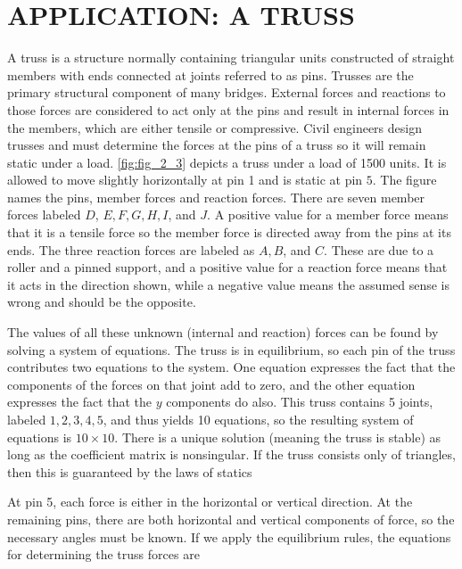 \documentclass[../main.tex]{subfiles}
\begin{document}
\section[Application: A Truss]{APPLICATION: A TRUSS}
A truss is a structure normally containing triangular units constructed of straight members with ends connected at joints referred to as pins. Trusses are the primary structural component of many bridges. External forces and reactions to those forces are considered to act only at the pins and result in internal forces in the members, which are either tensile or compressive. Civil engineers design trusses and must determine the forces at the pins of a truss so it will remain static under a load. \autoref{fig:fig_2_3} depicts a truss under a load of 1500 units. It is allowed to move slightly horizontally at pin 1 and is static at pin $5 .$ The figure names the pins, member forces and reaction forces. There are seven member forces labeled $D$, $E, F, G, H, I$, and $J .$ A positive value for a member force means that it is a tensile force so the member force is directed away from the pins at its ends. The three reaction forces are labeled as $A, B$, and $C .$ These are due to a roller and a pinned support, and a positive value for a reaction force means that it acts in the direction shown, while a negative value means the assumed sense is wrong and should be the opposite.

The values of all these unknown (internal and reaction) forces can be found by solving a system of equations. The truss is in equilibrium, so each pin of the truss contributes two equations to the system. One equation expresses the fact that the components of the forces on that joint add to zero, and the other equation expresses the fact that the $y$ components do also. This truss contains 5 joints, labeled $1,2,3,4,5$, and thus yields 10 equations, so the resulting system of equations is $10 \times 10 .$ There is a unique solution (meaning the truss is stable) as long as the coefficient matrix is nonsingular. If the truss consists only of triangles, then this is guaranteed by the laws of statics

At pin 5, each force is either in the horizontal or vertical direction. At the remaining pins, there are both horizontal and vertical components of force, so the necessary angles must be known. If we apply the equilibrium rules, the equations for determining the truss forces are
\end{document}
